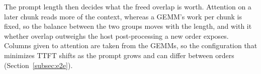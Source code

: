 The prompt length then decides what the freed overlap is worth.
Attention on a later chunk reads more of the context, whereas a GEMM's work per chunk is fixed, so the balance between the two groups moves with the length, and with it whether overlap outweighs the host post-processing a new order exposes.
Columns given to attention are taken from the GEMMs, so the configuration that minimizes TTFT shifts as the prompt grows and can differ between orders (Section~\ref{subsec:e2e}).
